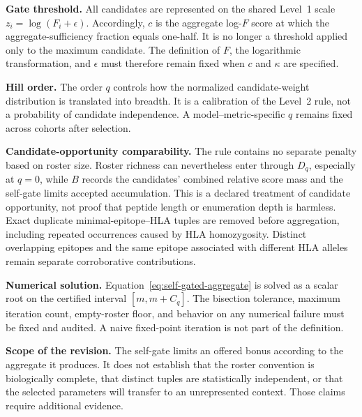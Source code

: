 \documentclass[11pt]{article}
\begin{document}
\textbf{Gate threshold.}
All candidates are represented on the shared Level~1 scale
$z_i=\log(F_i+\epsilon)$. Accordingly, $c$ is the aggregate log-$F$ score at
which the aggregate-sufficiency fraction equals one-half. It is no longer a
threshold applied only to the maximum candidate. The definition of $F$, the
logarithmic transformation, and $\epsilon$ must therefore remain fixed when
$c$ and $\kappa$ are specified.

\textbf{Hill order.}
The order $q$ controls how the normalized candidate-weight distribution is
translated into breadth. It is a calibration of the Level~2 rule, not a
probability of candidate independence. A model--metric-specific $q$ remains
fixed across cohorts after selection.

\textbf{Candidate-opportunity comparability.}
The rule contains no separate penalty based on roster size. Roster richness
can nevertheless enter through $D_q$, especially at $q=0$, while $B$ records
the candidates' combined relative score mass and the self-gate limits accepted
accumulation. This is a declared treatment of candidate opportunity, not proof
that peptide length or enumeration depth is harmless. Exact duplicate
minimal-epitope--HLA tuples are removed before aggregation, including repeated
occurrences caused by HLA homozygosity. Distinct overlapping epitopes and the
same epitope associated with different HLA alleles remain separate
corroborative contributions.

\textbf{Numerical solution.}
Equation~\eqref{eq:self-gated-aggregate} is solved as a scalar root on the
certified interval $[m,m+C_q]$. The bisection tolerance, maximum iteration
count, empty-roster floor, and behavior on any numerical failure must be fixed
and audited. A naive fixed-point iteration is not part of the definition.

\textbf{Scope of the revision.}
The self-gate limits an offered bonus according to the aggregate it produces.
It does not establish that the roster convention is biologically complete,
that distinct tuples are statistically independent, or that the selected
parameters will transfer to an unrepresented context. Those claims require
additional evidence.
\end{document}
